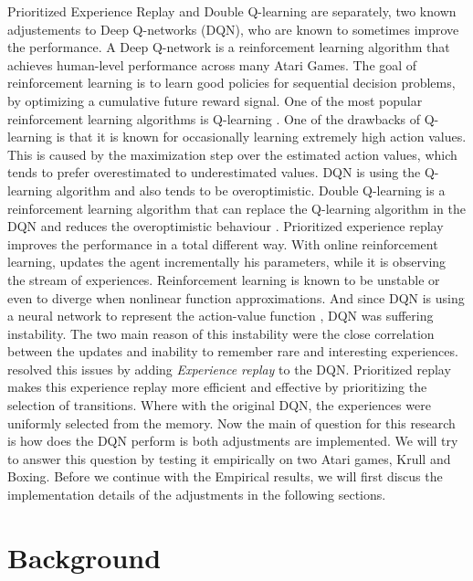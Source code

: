 \documentclass{sig-alternate}
\begin{document}
Prioritized Experience Replay \cite{schaul2015prioritized} and Double Q-learning \cite{van2016deep} are separately, two known adjustements to Deep Q-networks (DQN), who are known to sometimes improve the performance. A Deep Q-network is a reinforcement learning algorithm that achieves human-level performance across many Atari Games. \cite{mnih2015human} The goal of reinforcement learning \cite{sutton1998reinforcement} is to learn good policies for sequential decision problems, by optimizing a cumulative future reward signal. One of the most popular reinforcement learning algorithms is Q-learning \cite{watkins1992q}. One of the drawbacks of Q-learning is that it is known for occasionally learning extremely high action values. This is caused by the maximization step over the estimated action values, which tends to prefer overestimated to underestimated values. DQN is using the Q-learning algorithm and also tends to be overoptimistic. Double Q-learning is a reinforcement learning algorithm that can replace the Q-learning algorithm in the DQN and reduces the overoptimistic behaviour \cite{van2016deep}. Prioritized experience replay improves the performance in a total different way. With online reinforcement learning, updates the agent incrementally his parameters, while it is observing the stream of experiences. Reinforcement learning is known to be unstable or even to diverge when nonlinear function approximations. And since DQN is using a neural network to represent the action-value function , DQN was suffering instability. The two main reason of this instability were the close correlation between the updates and inability to remember rare and interesting experiences. \cite{mnih2015human} resolved this issues by adding \textit{Experience replay} \cite{lin1992self} to the DQN. Prioritized replay makes this experience replay more efficient and effective by prioritizing the selection of transitions. Where with the original DQN, the experiences were uniformly selected from the memory.  
Now the main of question for this research is how does the DQN perform is both adjustments are implemented. We will try to answer this question by testing it empirically on two Atari games, Krull and Boxing. Before we continue with the Empirical results, we will first discus the implementation details of the adjustments in the following sections.
 
\section{Background}
\end{document}
